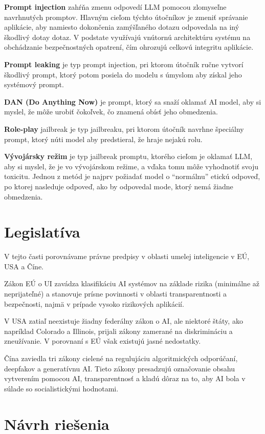 \textbf{Prompt injection} zahŕňa zmenu odpovedí LLM pomocou zlomyseľne navrhnutých promptov. Hlavným cieľom týchto útočníkov je zmeniť správanie aplikácie, aby namiesto dokončenia zamýšľaného dotazu odpovedala na iný škodlivý dotay dotaz. V podstate využívajú vnútornú architektúru systému na obchádzanie bezpečnostných opatrení, čím ohrozujú celkovú integritu aplikácie.

\textbf{Prompt leaking} je typ prompt injection, pri ktorom útočník ručne vytvorí škodlivý prompt, ktorý potom posiela do modelu s úmyslom aby získal jeho systémový prompt.

\textbf{DAN (Do Anything Now)} je prompt, ktorý sa snaží oklamať AI model, aby si myslel, že môže urobiť čokoľvek, čo znamená obísť jeho obmedzenia.

\textbf{Role-play} jailbreak je typ jailbreaku, pri ktorom útočník navrhne špeciálny prompt, ktorý núti model aby predstieral, že hraje nejakú rolu.

\textbf{Vývojársky režim} je typ jailbreak promptu, ktorého cieľom je oklamať LLM, aby si myslel, že je vo vývojárskom režime, a vďaka tomu môže vyhodnotiť svoju toxicitu. Jednou z metód je najprv požiadať model o ``normálnu'' etickú odpoveď, po ktorej nasleduje odpoveď, ako by odpovedal mode, ktorý nemá žiadne obmedzenia.

\section*{Legislatíva \label{sec:legislation_resume}}

V tejto časti porovnávame právne predpisy v oblasti umelej inteligencie v EÚ, USA a Číne.

Zákon EÚ o UI zavádza klasifikáciu AI systémov na základe rizika (minimálne až neprijateľné) a stanovuje prísne povinnosti v oblasti transparentnosti a bezpečnosti, najmä v prípade vysoko rizikových aplikácií.

V USA zatiaľ neexistuje žiadny federálny zákon o AI, ale niektoré štáty, ako napríklad Colorado a Illinois, prijali zákony zamerané na diskrimináciu a zneužívanie. V porovnaní s EÚ však existujú jasné nedostatky.

Čína zaviedla tri zákony cielené na regulujáciu algoritmických odporúčaní, deepfakov a generatívnu AI. Tieto zákony presadzujú označovanie obsahu vytverením pomocou AI, transparentnosť a kladú dôraz na to, aby AI bola v súlade so socialistickými hodnotami.

\section*{Návrh riešenia \label{sec:solution_proposal_resume}}

